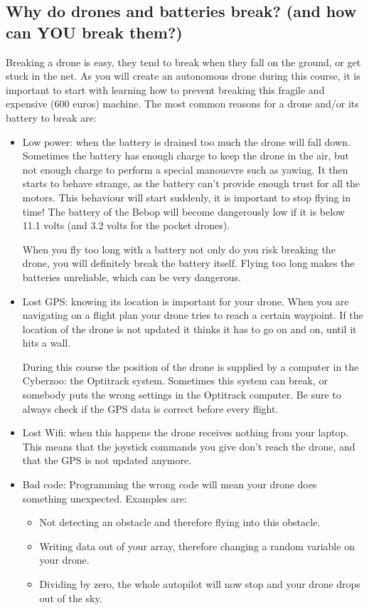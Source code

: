 \documentclass{article}
\begin{document}
\subsection*{Why do drones and batteries break? (and how can YOU break them?)}
Breaking a drone is easy, they tend to break when they fall on the ground, or get stuck in the net. As you will create an autonomous drone during this course, it is important to start with learning how to prevent breaking this fragile and expensive (600 euros) machine. The most common reasons for a drone and/or its battery to break are:
\begin{itemize}
\item Low power: when the battery is drained too much the drone will fall down. Sometimes the battery has enough charge to keep the drone in the air, but not enough charge to perform a special manouevre such as yawing. It then starts to behave strange, as the battery can't provide enough trust for all the motors. This behaviour will start suddenly, it is important to stop flying in time! The battery of the Bebop will become dangerously low if it is below 11.1 volts (and 3.2 volts for the pocket drones).  

When you fly too long with a battery not only do you risk breaking the drone, you will definitely break the battery itself. Flying too long makes the batteries unreliable, which can be very dangerous. 
\item Lost GPS: knowing its location is important for your drone. When you are navigating on a flight plan your drone tries to reach a certain waypoint. If the location of the drone is not updated it thinks it has to go on and on, until it hits a wall. 

During this course the position of the drone is supplied by a computer in the Cyberzoo: the Optitrack system. Sometimes this system can break, or somebody puts the wrong settings in the Optitrack computer. Be sure to always check if the GPS data is correct before every flight. 

\item Lost Wifi: when this happens the drone receives nothing from your laptop. This means that the joystick commands you give don't reach the drone, and that the GPS is not updated anymore. 
\item Bad code: Programming the wrong code will mean your drone does something unexpected. Examples are: 
\begin{itemize}
	\item Not detecting an obstacle and therefore flying into this obstacle. 
	\item Writing data out of your array, therefore changing a random variable on your drone. 
	\item Dividing by zero, the whole autopilot will now stop and your drone drops out of the sky. 
\end{itemize}
\end{itemize}
\end{document}
